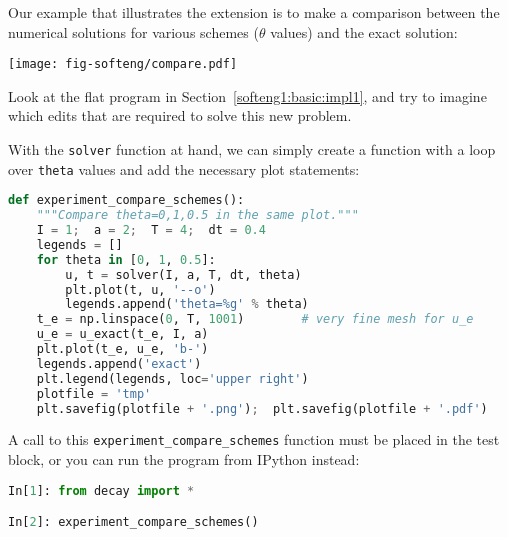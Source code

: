 \documentclass[graybox,sectrefs,envcountresetchap,open=right,final]{svmonodo}
\newenvironment{question_mdfboxadmon}[1][]{
\begin{question_mdfboxmdframed}[frametitle=#1]
}
{
\end{question_mdfboxmdframed}
}
\begin{document}
Our example that illustrates the extension
is to make a comparison between the numerical solutions
for various schemes ($\theta$ values) and the exact solution:

\vspace{6mm}

\centerline{\texttt{[image: fig-softeng/compare.pdf]}}

\vspace{6mm}


\begin{question_mdfboxadmon}
Look at the flat program in
Section~\ref{softeng1:basic:impl1},
and try to imagine which edits that are required to solve this new problem.
\end{question_mdfboxadmon} %



With the \texttt{solver} function at hand, we can simply create a function
with a loop over \texttt{theta} values and add the necessary plot statements:

















\begin{lstlisting}[language=python,style=blue1_bluegreen]
def experiment_compare_schemes():
    """Compare theta=0,1,0.5 in the same plot."""
    I = 1;  a = 2;  T = 4;  dt = 0.4
    legends = []
    for theta in [0, 1, 0.5]:
        u, t = solver(I, a, T, dt, theta)
        plt.plot(t, u, '--o')
        legends.append('theta=%g' % theta)
    t_e = np.linspace(0, T, 1001)        # very fine mesh for u_e
    u_e = u_exact(t_e, I, a)
    plt.plot(t_e, u_e, 'b-')
    legends.append('exact')
    plt.legend(legends, loc='upper right')
    plotfile = 'tmp'
    plt.savefig(plotfile + '.png');  plt.savefig(plotfile + '.pdf')

\end{lstlisting}


A call to this \Verb!experiment_compare_schemes! function must be placed
in the test block, or you can run the program from IPython instead:





\begin{lstlisting}[language=python,style=blue1_bluegreen]
In[1]: from decay import *

In[2]: experiment_compare_schemes()

\end{lstlisting}
\end{document}
